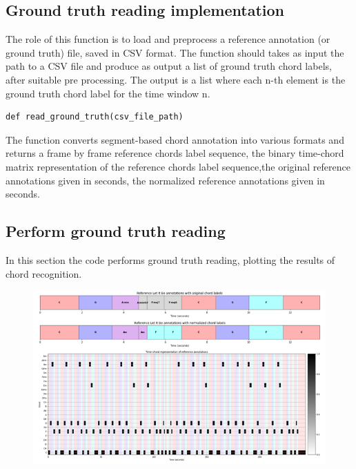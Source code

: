\documentclass[
	12pt, %
]{fphw}
\begin{document}
\subsection*{Ground truth reading implementation}
The role of this function is to load and preprocess a reference annotation (or ground truth) file, saved in CSV format. The function should takes as input the path to a CSV file and produce as output a list of ground truth chord labels, after suitable pre processing. The output is a list where each n-th element is the ground truth chord label for the time window n.

\begin{lstlisting}
def read_ground_truth(csv_file_path)
\end{lstlisting}

The function converts segment-based chord annotation into various formats and returns a frame by frame reference chords label sequence, the binary time-chord matrix representation of the reference chords label sequence,the original reference annotations given in seconds, the normalized reference annotations given in seconds.

\subsection*{Perform ground truth reading}
In this section the code performs ground truth reading, plotting the results of chord recognition.

\begin{figure}[H]
 \centering
 \includegraphics[scale=1]{./images/2_reference_annotations.png}
\end{figure}

\end{document}
